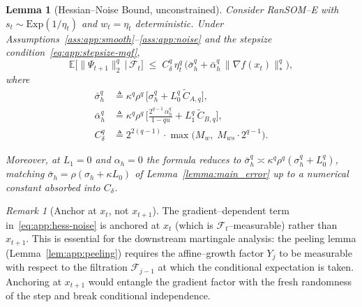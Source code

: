 \documentclass{article}
\theoremstyle{plain}
\newtheorem{lemma}[theorem]{Lemma}
\theoremstyle{definition}
\theoremstyle{remark}
\newtheorem{remark}[theorem]{Remark}
\begin{document}
\begin{lemma}[Hessian--Noise Bound, unconstrained]
\label{lem:app:hess-noise}
Consider RanSOM--E with $s_t \sim \mathrm{Exp}(1/\eta_t)$ and $w_t =
\eta_t$ deterministic. Under
Assumptions~\ref{ass:app:smooth}--\ref{ass:app:noise} and the stepsize
condition~\eqref{eq:app:stepsize-mgf},
\begin{equation}
  \mathbb{E}\bigl[\|\Psi_{t+1}\|_2^q \,\big|\, \mathcal{F}_t\bigr]
  \;\leq\;
  C_\delta^q\, \eta_t^q\,
    \bigl(\bar\sigma_h^q + \bar\alpha_h^q\, \|\nabla f(x_t)\|_*^q\bigr),
  \label{eq:app:hess-noise}
\end{equation}
where
\begin{align}
  \bar\sigma_h^q
  &\triangleq \kappa^q \rho^q\,\bigl[\sigma_h^q
    + L_0^q\, \widetilde C_{A,q}\bigr],
  \label{eq:app:sigma-bar} \\
  \bar\alpha_h^q
  &\triangleq \kappa^q \rho^q\,\bigl[\tfrac{2^{q-1}\,\alpha_h^q}{1 - qu}
    + L_1^q\, \widetilde C_{B,q}\bigr],
  \label{eq:app:alpha-bar} \\
  C_\delta^q
  &\triangleq 2^{2(q-1)}\cdot \max\bigl(M_w,\; M_{ws}\cdot 2^{q-1}\bigr).
  \label{eq:app:C-delta}
\end{align}

Moreover, at $L_1 = 0$ and $\alpha_h = 0$ the formula reduces to
$\bar\sigma_h^q \asymp \kappa^q\rho^q(\sigma_h^q + L_0^q)$, matching
$\bar\sigma_h = \rho(\sigma_h + \kappa L_0)$ of
Lemma~\ref{lemma:main_error} up to a numerical constant absorbed into
$C_\delta$.
\end{lemma}

\begin{remark}[Anchor at $x_t$, not $x_{t+1}$]
\label{rem:app:anchor}
The gradient--dependent term in~\eqref{eq:app:hess-noise} is anchored at
$x_t$ (which is $\mathcal{F}_t$--measurable) rather than $x_{t+1}$. This
is essential for the downstream martingale analysis: the peeling lemma
(Lemma~\ref{lem:app:peeling}) requires the affine--growth factor $Y_j$
to be measurable with respect to the filtration $\mathcal{F}_{j-1}$ at
which the conditional expectation is taken. Anchoring at $x_{t+1}$
would entangle the gradient factor with the fresh randomness of the
step and break conditional independence.
\end{remark}
\end{document}
